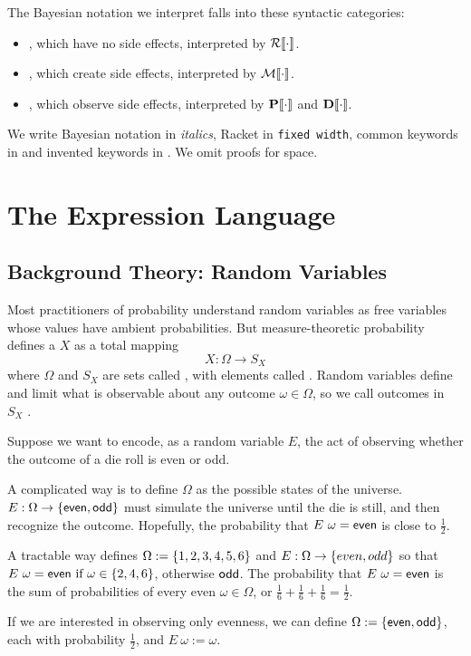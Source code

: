 The Bayesian notation we interpret falls into these syntactic categories:
\begin{itemize}
\item {}, which have no side effects, interpreted by $\mathcal{R}\!\left\llbracket{\cdot}\right\rrbracket$.
\item {}, which create side effects, interpreted by $\mathcal{M}\!\left\llbracket{\cdot}\right\rrbracket$.
\item {}, which observe side effects, interpreted by $\mathbf{P}\!\left\llbracket{\cdot}\right\rrbracket$ and $\mathbf{D}\!\left\llbracket{\cdot}\right\rrbracket$.
\end{itemize}

We write Bayesian notation in \textit{italics}, Racket in \texttt{fixed width}, common keywords in  and invented keywords in . We omit proofs for space.


\section{The Expression Language}
\label{section:random-variables}

\subsection{Background Theory: Random Variables}

Most practitioners of probability understand random variables as free variables whose values have ambient probabilities. But measure-theoretic probability defines a  $X$ as a total mapping
\begin{equation}
	X : \Omega \to S_X
\end{equation}
where $\Omega$ and $S_X$ are sets called , with elements called . Random variables define and limit what is observable about any outcome $\omega \in \Omega$, so we call outcomes in $S_X$ .

\begin{example}
\label{example:even/odd}
Suppose we want to encode, as a random variable $E$, the act of observing whether the outcome of a die roll is even or odd.

A complicated way is to define $\Omega$ as the possible states of the universe. $E : \Omega \to \{{\mathsf{even},\mathsf{odd}}\}$ must simulate the universe until the die is still, and then recognize the outcome. Hopefully, the probability that $E~\omega = \mathsf{even}$ is close to $\frac{1}{2}$.

A tractable way defines $\Omega := \{{1,2,3,4,5,6}\}$ and $E : \Omega \to \{{even,odd}\}$ so that $E~\omega = \mathsf{even} \text{ if } \omega \in \{{2,4,6}\}$, otherwise $\mathsf{odd}$. The probability that $E~\omega = \mathsf{even}$ is the sum of probabilities of every even $\omega \in \Omega$, or $\tfrac{1}{6} + \tfrac{1}{6} + \tfrac{1}{6} = \tfrac{1}{2}$.

If we are interested in observing only evenness, we can define $\Omega := \{{\mathsf{even},\mathsf{odd}}\}$, each with probability $\tfrac{1}{2}$, and $E~\omega := \omega$.
\exampleqed
\end{example}

